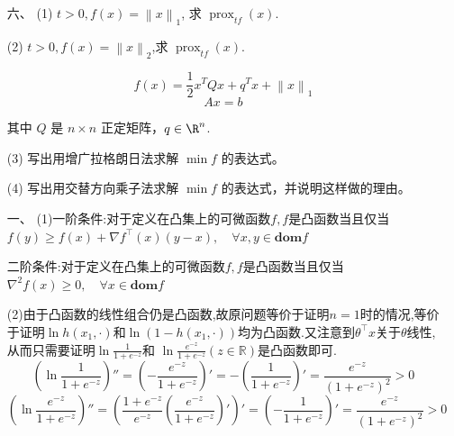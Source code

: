 \begin{itemize}
(3) 已知从 $x_{k}$ 到 $x_{k+1}$ 的迭代系数为 $t_k$,
求证： $\dfrac{x_{k} - x_{k+1}}{t_{k}} \in \partial f(x_{k+1})$. 

(4) 证明：\[
f(x_{k+1}) \leq f(x_{k}) - \frac{   1}{t_{k}}\left\| x_{k   } - x_{k+1} \right\|^2
\]

(5) 证明：
\[
f(x_{k+1}) \leq f(x^*)+\frac{1}{2t_{k}}\left( \left\| x_{k} - x^* \right\|^2 -\left\| x_{k+1} - x^* \right\|^2 \right) 
\]

(6) 证明：

\[
f(x_{k}) - f(x^*) \leq \frac{\left\| x_0 - x^* \right\|^2}
{2\sum_{1 \leq i \leq k-1}t_{i}} 
\]

\item[六、] (1) $t>0,f(x)= \left\| x \right\|_{1}$,
求 $\operatorname{prox}_{tf}(x)$.

(2) $t>0,f(x)= \left\| x \right\|_{2}$,求 $\operatorname{prox}_{tf}(x)$.

\[
f(x) = \frac{1}{2} x^{T}Qx +q^T x + \left\| x \right\|_{1}
\]
\[
A x =b
\]

其中 $Q$ 是 $n \times n$ 正定矩阵，$q \in \R^{n}$.

(3) 写出用增广拉格朗日法求解 $\min f$ 的表达式。

(4) 写出用交替方向乘子法求解 $\min f$ 的表达式，并说明这样做的理由。
\end{itemize}

\begin{proofc}[提示]
    \begin{itemize}
    \item[一、](1)一阶条件:对于定义在凸集上的可微函数$f,f$是凸函数当且仅当$f(y)\geq f(x)+\nabla f^\top(x)(y-x),\quad\forall x,y\in\textbf{dom}f$\par
    二阶条件:对于定义在凸集上的可微函数$f,f$是凸函数当且仅当$\nabla^2f(x)\geq0,\quad\forall x\in\textbf{dom}f$\par
    (2)由于凸函数的线性组合仍是凸函数,故原问题等价于证明$n=1$时的情况,等价于证明$\ln h(x_1,\cdot)$和$\ln(1-h(x_1,\cdot))$均为凸函数.又注意到$\theta^\top x$关于$\theta$线性,从而只需要证明$\ln\frac{1}{1+e^{-z}}$和
    $\ln\frac{e^{-z}}{1+e^{-z}}(z\in\mathbb{R})$是凸函数即可.
    $$(\ln\frac{1}{1+e^{-z}})''=(-\frac{e^{-z}}{1+e^{-z}})'=-(\frac{1}{1+e^{-z}})'=\frac{e^{-z}}{(1+e^{-z})^2}>0$$
    $$(\ln\frac{e^{-z}}{1+e^{-z}})''=(\frac{1+e^{-z}}{e^{-z}}(\frac{e^{-z}}{1+e^{-z}})')'=(-\frac{1}{1+e^{-z}})'=\frac{e^{-z}}{(1+e^{-z})^2}>0$$
\end{itemize}
\end{proofc}







